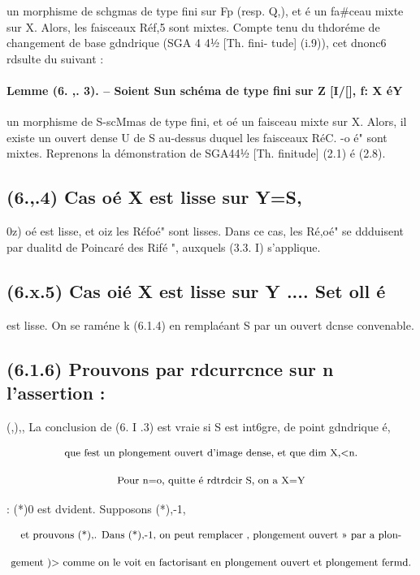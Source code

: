 \documentclass[11pt]{article}
\theoremstyle{remark}
\begin{document}
un morphisme de schgmas de type fini sur Fp (resp. Q,), et é un fa\#ceau mixte sur X. Alors, les faisceaux Réf,5 sont mixtes. Compte tenu du thdoréme de changement de base gdndrique (SGA 4 4½ [Th. fini- tude] (i.9)), cet dnonc6 rdsulte du suivant :

\paragraph{Lemme (6. ,. 3). -- Soient Sun schéma de type fini sur Z [I/[], f: X éY}

un morphisme de S-scMmas de type fini, et oé un faisceau mixte sur X. Alors, il existe un ouvert dense U de S au-dessus duquel les faisceaux RéC. -o é" sont mixtes. Reprenons la démonstration de SGA44½ [Th. finitude] (2.1) é (2.8).

\subsection*{(6.,.4) Cas oé X est lisse sur Y=S,}

0z) oé est lisse, et oiz les Réfoé" sont lisses. Dans ce cas, les Ré,oé" se ddduisent par dualitd de Poincaré des Rifé ", auxquels (3.3. I) s'applique.

\subsection*{(6.x.5) Cas oié X est lisse sur Y .... Set oll é}

est lisse. On se raméne k (6.1.4) en remplaéant S par un ouvert dcnse convenable.

\subsection*{(6.1.6) Prouvons par rdcurrcnce sur n l'assertion :}

(,),, La conclusion de (6. I .3) est vraie si S est int6gre, de point gdndrique é,

\[\text{\small que fest un plongement ouvert d'image dense, et que dim X,<n.}\]

\[\text{\small Pour n=o, quitte é rdtrdcir S, on a X=Y}\]

: (*)0 est dvident. Supposons (*),-1,

\[\text{\small et prouvons (*),. Dans (*),-1, on peut remplacer , plongement ouvert >> par a plon-}\]

\[\text{\small gement )> comme on le voit en factorisant en plongement ouvert et plongement fermd.}\]
\end{document}
